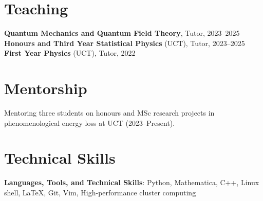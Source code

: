 \documentclass[10pt,letter,sans]{moderncv}
\begin{document}
\section{Teaching}
\textbf{Quantum Mechanics and Quantum Field Theory}, Tutor, 2023--2025 \\
\textbf{Honours and Third Year Statistical Physics} (UCT), Tutor, 2023--2025 \\
\textbf{First Year Physics} (UCT), Tutor, 2022


\section{Mentorship}
Mentoring three students on honours and MSc research projects in phenomenological energy loss at UCT (2023--Present).


\section{Technical Skills}
\textbf{Languages, Tools, and Technical Skills}: Python, Mathematica, C++, Linux shell, \LaTeX, Git, Vim, High-performance cluster computing
\end{document}
